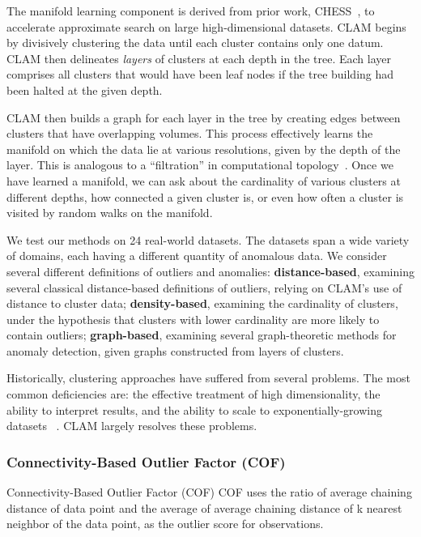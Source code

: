 The manifold learning component is derived from prior work, CHESS~\cite{ishaq2019entropy}, to accelerate approximate search on large high-dimensional datasets.
CLAM begins by divisively clustering the data until each cluster contains only one datum.
CLAM then delineates \textit{layers} of clusters at each depth in the tree.
Each layer comprises all clusters that would have been leaf nodes if the tree building had been halted at the given depth.

CLAM then builds a graph for each layer in the tree by creating edges between clusters that have overlapping volumes.
This process effectively learns the manifold on which the data lie at various resolutions, given by the depth of the layer.
This is analogous to a ``filtration'' in computational topology~\cite{carlsson2009topology}.
Once we have learned a manifold, we can ask about the cardinality of various clusters at different depths, how connected a given cluster is, or even how often a cluster is visited by random walks on the manifold.

We test our methods on 24 real-world datasets.
The datasets span a wide variety of domains, each having a different quantity of anomalous data.
We consider several different definitions of outliers and anomalies: \textbf{distance-based}, examining several classical distance-based definitions of outliers, relying on CLAM's use of distance to cluster data; \textbf{density-based}, examining the cardinality of clusters, under the hypothesis that clusters with lower cardinality are more likely to contain outliers; \textbf{graph-based}, examining several graph-theoretic methods for anomaly detection, given graphs constructed from layers of clusters.

Historically, clustering approaches have suffered from several problems.
The most common deficiencies are: the effective treatment of high dimensionality, the ability to interpret results, and the ability to scale to exponentially-growing datasets ~\cite{agrawal1998automatic}.
CLAM largely resolves these problems.




\subsubsection{Connectivity-Based Outlier Factor (COF)}
\label{subsubsec:introduction:related-works:cof}
Connectivity-Based Outlier Factor (COF) COF uses the ratio of average chaining distance of data point and the average of average chaining distance of k nearest neighbor of the data point, as the outlier score for observations.
\cite{tang2002cof}

